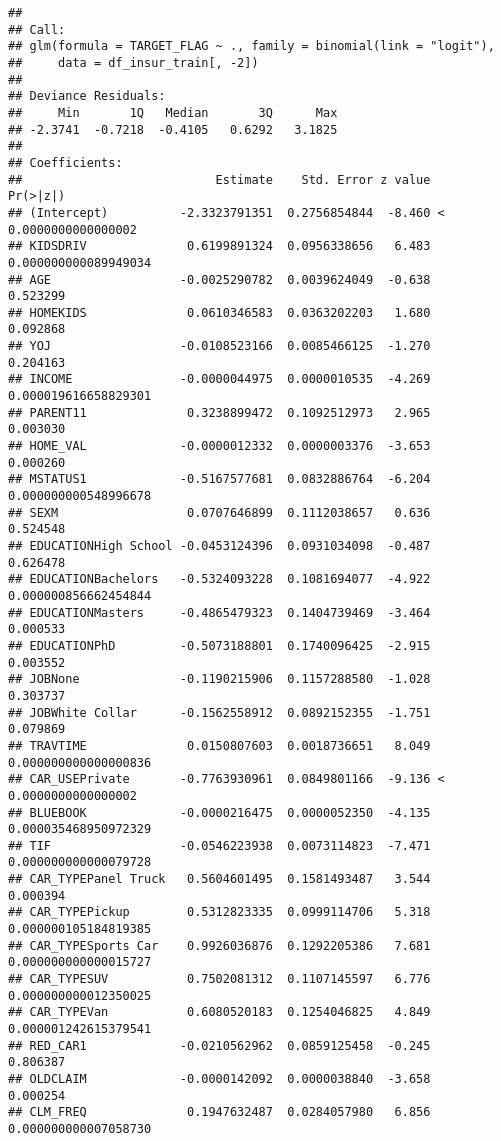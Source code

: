 \documentclass[
]{article}
\begin{document}
\begin{verbatim}
## 
## Call:
## glm(formula = TARGET_FLAG ~ ., family = binomial(link = "logit"), 
##     data = df_insur_train[, -2])
## 
## Deviance Residuals: 
##     Min       1Q   Median       3Q      Max  
## -2.3741  -0.7218  -0.4105   0.6292   3.1825  
## 
## Coefficients:
##                           Estimate    Std. Error z value             Pr(>|z|)
## (Intercept)          -2.3323791351  0.2756854844  -8.460 < 0.0000000000000002
## KIDSDRIV              0.6199891324  0.0956338656   6.483 0.000000000089949034
## AGE                  -0.0025290782  0.0039624049  -0.638             0.523299
## HOMEKIDS              0.0610346583  0.0363202203   1.680             0.092868
## YOJ                  -0.0108523166  0.0085466125  -1.270             0.204163
## INCOME               -0.0000044975  0.0000010535  -4.269 0.000019616658829301
## PARENT11              0.3238899472  0.1092512973   2.965             0.003030
## HOME_VAL             -0.0000012332  0.0000003376  -3.653             0.000260
## MSTATUS1             -0.5167577681  0.0832886764  -6.204 0.000000000548996678
## SEXM                  0.0707646899  0.1112038657   0.636             0.524548
## EDUCATIONHigh School -0.0453124396  0.0931034098  -0.487             0.626478
## EDUCATIONBachelors   -0.5324093228  0.1081694077  -4.922 0.000000856662454844
## EDUCATIONMasters     -0.4865479323  0.1404739469  -3.464             0.000533
## EDUCATIONPhD         -0.5073188801  0.1740096425  -2.915             0.003552
## JOBNone              -0.1190215906  0.1157288580  -1.028             0.303737
## JOBWhite Collar      -0.1562558912  0.0892152355  -1.751             0.079869
## TRAVTIME              0.0150807603  0.0018736651   8.049 0.000000000000000836
## CAR_USEPrivate       -0.7763930961  0.0849801166  -9.136 < 0.0000000000000002
## BLUEBOOK             -0.0000216475  0.0000052350  -4.135 0.000035468950972329
## TIF                  -0.0546223938  0.0073114823  -7.471 0.000000000000079728
## CAR_TYPEPanel Truck   0.5604601495  0.1581493487   3.544             0.000394
## CAR_TYPEPickup        0.5312823335  0.0999114706   5.318 0.000000105184819385
## CAR_TYPESports Car    0.9926036876  0.1292205386   7.681 0.000000000000015727
## CAR_TYPESUV           0.7502081312  0.1107145597   6.776 0.000000000012350025
## CAR_TYPEVan           0.6080520183  0.1254046825   4.849 0.000001242615379541
## RED_CAR1             -0.0210562962  0.0859125458  -0.245             0.806387
## OLDCLAIM             -0.0000142092  0.0000038840  -3.658             0.000254
## CLM_FREQ              0.1947632487  0.0284057980   6.856 0.000000000007058730

\end{verbatim}
\end{document}
